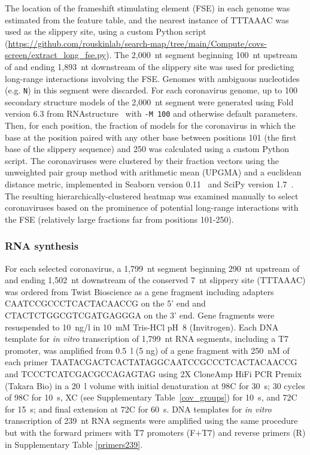 \documentclass[main.tex]{subfiles}
\begin{document}
The location of the frameshift stimulating element (FSE) in each genome was estimated from the feature table, and the nearest instance of TTTAAAC was used as the slippery site, using a custom Python script (\url{https://github.com/rouskinlab/search-map/tree/main/Compute/covs-screen/extract_long_fse.py}).
The 2,000~nt segment beginning 100~nt upstream of and ending 1,893~nt downstream of the slippery site was used for predicting long-range interactions involving the FSE.
Genomes with ambiguous nucleotides (e.g. \verb|N|) in this segment were discarded.
For each coronavirus genome, up to 100 secondary structure models of the 2,000~nt segment were generated using Fold version 6.3 from RNAstructure~\cite{Reuter2010} with \verb|-M 100| and otherwise default parameters.
Then, for each position, the fraction of models for the coronavirus in which the base at the position paired with any other base between positions 101 (the first base of the slippery sequence) and 250 was calculated using a custom Python script.
The coronaviruses were clustered by their fraction vectors using the unweighted pair group method with arithmetic mean (UPGMA) and a euclidean distance metric, implemented in Seaborn version 0.11~\cite{Waskom2021} and SciPy version 1.7~\cite{Virtanen2020}.
The resulting hierarchically-clustered heatmap was examined manually to select coronaviruses based on the prominence of potential long-range interactions with the FSE (relatively large fractions far from positions 101-250).

\subsubsection{RNA synthesis}

For each selected coronavirus, a 1,799~nt segment beginning 290~nt upstream of and ending 1,502~nt downstream of the conserved 7~nt slippery site (TTTAAAC) was ordered from Twist Bioscience as a gene fragment including adapters CAATCCGCCCTCACTACAACCG on the 5' end and CTACTCTGGCGTCGATGAGGGA on the 3' end.
Gene fragments were resuspended to 10~ng/\textmu l in 10~mM Tris-HCl pH~8 (Invitrogen).
Each DNA template for \textit{in vitro} transcription of 1,799~nt RNA segments, including a T7 promoter, was amplified from 0.5~\textmu l (5 ng) of a gene fragment with 250~nM of each primer TAATACGACTCACTATAGGCAATCCGCCCTCACTACAACCG and TCCCTCATCGACGCCAGAGTAG using 2X CloneAmp HiFi PCR Premix (Takara Bio) in a 20~\textmu l volume with initial denaturation at 98\textdegree C for 30~s; 30 cycles of 98\textdegree C for 10~s, X\textdegree C (see Supplementary Table~\ref{cov_groups}) for 10~s, and 72\textdegree C for 15~s; and final extension at 72\textdegree C for 60~s.
DNA templates for \textit{in vitro} transcription of 239~nt RNA segments were amplified using the same procedure but with the forward primers with T7 promoters (F+T7) and reverse primers (R) in Supplementary Table \ref{primers239}.
\end{document}
